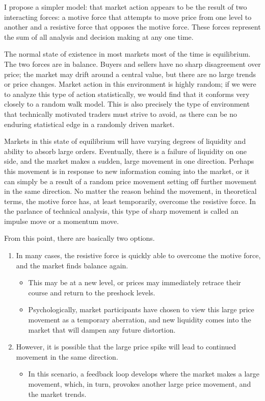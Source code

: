 \documentclass[10pt,twocolumn]{article}
\begin{document}
I propose a simpler model: that market action appears to be the result of two interacting forces: a motive force that attempts to move price from one level to another and a resistive force that opposes the motive force. These forces represent the sum of all analysis and decision making at any one time.

The normal state of existence in most markets most of the time is equilibrium. The two forces are in balance. Buyers and sellers have no sharp disagreement over price; the market may drift around a central value, but there are no large trends or price changes. Market action in this environment is highly random; if we were to analyze this type of action statistically, we would find that it conforms very closely to a random walk model. This is also precisely the type of environment that technically motivated traders must strive to avoid, as there can be no enduring statistical edge in a randomly driven market.

Markets in this state of equilibrium will have varying degrees of liquidity and ability to absorb large orders. Eventually, there is a failure of liquidity on one side, and the market makes a sudden, large movement in one direction. Perhaps this movement is in response to new information coming into the market, or it can simply be a result of a random price movement setting off further movement in the same direction. No matter the reason behind the movement, in theoretical terms, the motive force has, at least temporarily, overcome the resistive force. In the parlance of technical analysis, this type of sharp movement is called an impulse move or a momentum move.

From this point, there are basically two options.
\begin{enumerate}
  \item In many cases, the resistive force is quickly able to overcome the motive force, and the market finds balance again.
  \begin{itemize}
    \item This may be at a new level, or prices may immediately retrace their course and return to the preshock levels.
    \item Psychologically, market participants have chosen to view this large price movement as a temporary aberration, and new liquidity comes into the market that will dampen any future distortion.
  \end{itemize}
  \item However, it is possible that the large price spike will lead to continued movement in the same direction.
  \begin{itemize}
    \item In this scenario, a feedback loop develops where the market makes a large movement, which, in turn, provokes another large price movement, and the market trends.
  \end{itemize}
\end{enumerate}
\end{document}
